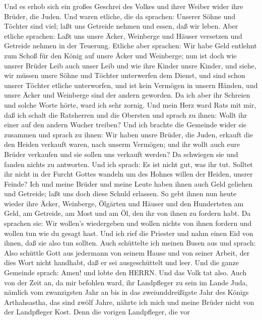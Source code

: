  Und es erhob sich ein großes Geschrei des Volkes und ihrer
Weiber wider ihre Brüder, die Juden.  Und waren etliche, die
da sprachen: Unserer Söhne und Töchter sind viel; laßt uns Getreide
nehmen und essen, daß wir leben.  Aber etliche sprachen:
Laßt uns unsre Äcker, Weinberge und Häuser versetzen und Getreide nehmen
in der Teuerung.  Etliche aber sprachen: Wir habe Geld
entlehnt zum Schoß für den König auf unsre Äcker und Weinberge;
 nun ist doch wie unsrer Brüder Leib auch unser Leib und wie
ihre Kinder unsre Kinder, und siehe, wir müssen unsre Söhne und Töchter
unterwerfen dem Dienst, und sind schon unsrer Töchter etliche
unterworfen, und ist kein Vermögen in unsern Händen, und unsre Äcker und
Weinberge sind der andern geworden.  Da ich aber ihr
Schreien und solche Worte hörte, ward ich sehr zornig.  Und
mein Herz ward Rats mit mir, daß ich schalt die Ratsherren und die
Obersten und sprach zu ihnen: Wollt ihr einer auf den andern Wucher
treiben? Und ich brachte die Gemeinde wider sie zusammen 
und sprach zu ihnen: Wir haben unsre Brüder, die Juden, erkauft die den
Heiden verkauft waren, nach unserm Vermögen; und ihr wollt auch eure
Brüder verkaufen und sie sollen uns verkauft werden? Da schwiegen sie
und fanden nichts zu antworten.  Und ich sprach: Es ist
nicht gut, was ihr tut. Solltet ihr nicht in der Furcht Gottes wandeln
um des Hohnes willen der Heiden, unsrer Feinde?  Ich und
meine Brüder und meine Leute haben ihnen auch Geld geliehen und
Getreide; laßt uns doch diese Schuld erlassen.  So gebt
ihnen nun heute wieder ihre Äcker, Weinberge, Ölgärten und Häuser und
den Hundertsten am Geld, am Getreide, am Most und am Öl, den ihr von
ihnen zu fordern habt.  Da sprachen sie: Wir wollen's
wiedergeben und wollen nichts von ihnen fordern und wollen tun wie du
gesagt hast. Und ich rief die Priester und nahm einen Eid von ihnen, daß
sie also tun sollten.  Auch schüttelte ich meinen Busen aus
und sprach: Also schüttle Gott aus jedermann von seinem Hause und von
seiner Arbeit, der dies Wort nicht handhabt, daß er sei ausgeschüttelt
und leer. Und die ganze Gemeinde sprach: Amen! und lobte den HERRN. Und
das Volk tat also.  Auch von der Zeit an, da mir befohlen
ward, ihr Landpfleger zu sein im Lande Juda, nämlich vom zwanzigsten
Jahr an bis in das zweiunddreißigste Jahr des Königs Arthahsastha, das
sind zwölf Jahre, nährte ich mich und meine Brüder nicht von der
Landpfleger Kost.  Denn die vorigen Landpfleger, die vor
